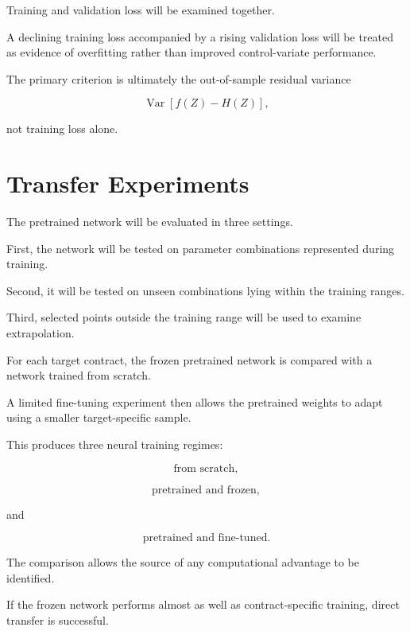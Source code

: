 \documentclass[12pt,a4paper]{report}
\begin{document}
Training and validation loss will be examined together.

A declining training loss accompanied by a rising validation loss will be treated as evidence of overfitting rather than improved control-variate performance.

The primary criterion is ultimately the out-of-sample residual variance

\begin{equation}
\operatorname{Var}
\left[
f(Z)-H(Z)
\right],
\end{equation}

not training loss alone.

\section{Transfer Experiments}

The pretrained network will be evaluated in three settings.

First, the network will be tested on parameter combinations represented during training.

Second, it will be tested on unseen combinations lying within the training ranges.

Third, selected points outside the training range will be used to examine extrapolation.

For each target contract, the frozen pretrained network is compared with a network trained from scratch.

A limited fine-tuning experiment then allows the pretrained weights to adapt using a smaller target-specific sample.

This produces three neural training regimes:

\begin{equation}
\text{from scratch},
\end{equation}

\begin{equation}
\text{pretrained and frozen},
\end{equation}

and

\begin{equation}
\text{pretrained and fine-tuned}.
\end{equation}

The comparison allows the source of any computational advantage to be identified.

If the frozen network performs almost as well as contract-specific training, direct transfer is successful.
\end{document}
